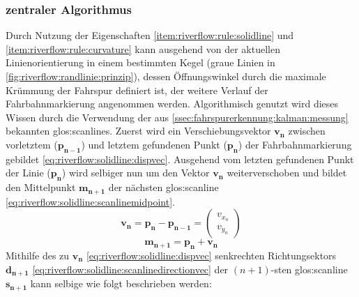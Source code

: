 \subsubsection{zentraler Algorithmus}
Durch Nutzung der Eigenschaften \ref{item:riverflow:rule:solidline} und  \ref{item:riverflow:rule:curvature} kann ausgehend von der aktuellen Linienorientierung in einem bestimmten Kegel (graue Linien in \ref{fig:riverflow:randlinie:prinzip}), dessen Öffnungswinkel durch die maximale Krümmung der Fahrspur definiert ist, der weitere Verlauf der Fahrbahnmarkierung angenommen werden.
Algorithmisch genutzt wird dieses Wissen durch die Verwendung der aus \ref{ssec:fahrspurerkennung:kalman:messung} bekannten \glspl{glos:scanline}.
Zuerst wird ein Verschiebungsvektor \begin{math} \boldsymbol{v_n} \end{math} zwischen vorletztem (\begin{math} \boldsymbol{p_{n-1}} \end{math}) und letztem gefundenen Punkt  (\begin{math} \boldsymbol{p_n} \end{math})  der Fahrbahnmarkierung gebildet \eqref{eq:riverflow:solidline:dispvec}. Ausgehend vom letzten gefundenen Punkt der Linie (\begin{math} \boldsymbol{p_n} \end{math}) wird selbiger nun um den Vektor \begin{math} \boldsymbol{v_n} \end{math} weiterverschoben und bildet den Mittelpunkt  \begin{math} \boldsymbol{m_{n+1}}  \end{math} der nächsten \gls{glos:scanline} \eqref{eq:riverflow:solidline:scanlinemidpoint}.
\begin{equation}
\label{eq:riverflow:solidline:dispvec}
\boldsymbol{v_n} =  \boldsymbol{p_n} - \boldsymbol{p_{n-1}}
= 
\begin{pmatrix}
v_{x_n} \\
v_{y_n}
\end{pmatrix}
\end{equation}
\begin{equation}
\label{eq:riverflow:solidline:scanlinemidpoint}
\boldsymbol{m_{n+1}} =  \boldsymbol{p_n} + \boldsymbol{v_n}
\end{equation}
Mithilfe des zu \begin{math} \boldsymbol{v_n} \end{math} \eqref{eq:riverflow:solidline:dispvec} senkrechten Richtungsektors \begin{math} \boldsymbol{d_{n+1}} \end{math} \eqref{eq:riverflow:solidline:scanlinedirectionvec} der \begin{math} (n+1)\end{math}-sten  \gls{glos:scanline} \begin{math} \boldsymbol{s_{n+1}} \end{math} kann selbige wie folgt beschrieben werden:
